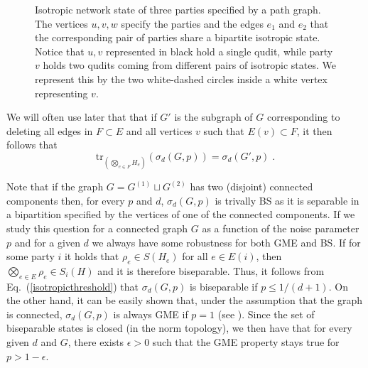 \documentclass[a4paper,onecolumn,accepted=2024-12-14]{quantumarticle}
\theoremstyle{plain}
\def\tr{\mathrm{tr}}
\begin{document}
\begin{figure}[h]
 \centering
\caption{Isotropic network state of three parties specified by a path graph. The vertices $u,v,w$ specify the parties and the edges $e_1$ and $e_2$ that the corresponding pair of parties share a bipartite isotropic state. Notice that $u,v$ represented in black hold a single qudit, while party $v$ holds two qudits coming from different pairs of isotropic states. We represent this by the two white-dashed circles inside a white vertex representing $v$.}
\label{fig:split}
\end{figure}

We will often use later that that if $G'$ is the subgraph of
$G$ corresponding to deleting all edges in $F\subset E$ and all vertices $v$
such that $E(v)\subset F$, it then follows that
\begin{equation}\label{edgedeletion}
    \tr_{\left(\bigotimes_{e\in F}H_e\right)}\left(\sigma_d(G,p)\right)=\sigma_d(G',p)\;.
\end{equation}



Note that if the graph $G=G^{(1)}\sqcup G^{(2)}$ has two (disjoint) connected components then, for every $p$ and $d$, $\sigma_d(G,p)$ is trivally BS as it is separable in a bipartition specified by the vertices of one of the connected components. If we study this question for a connected graph $G$ as a function of the noise parameter $p$ and for a given $d$ we always have some robustness for both GME and BS. If for some party $i$ it holds that $\rho_e\in S(H_e)$ for all $e\in E(i)$, then $\bigotimes_{e\in E}\rho_e\in S_i(H)$ and it is therefore biseparable. Thus, it follows from Eq.~(\ref{isotropicthreshold}) that $\sigma_d(G,p)$ is biseparable if $p\leq1/(d+1)$. On the other hand, it can be easily shown that, under the assumption that the graph is connected, $\sigma_d(G,p)$ is always GME if $p=1$ (see \cite{ASGME}). Since the set of biseparable states is closed (in the norm topology),
we then have that for every given $d$ and $G$, there exists $\epsilon>0$ such that the GME property stays true for $p>1-\epsilon$.
\end{document}
